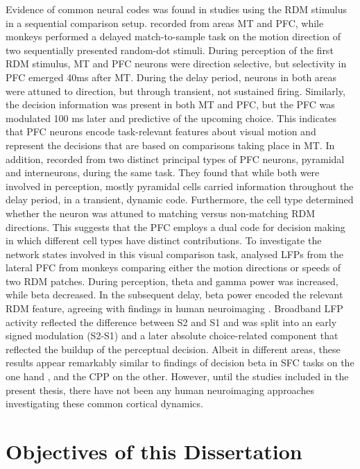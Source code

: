 Evidence of common neural codes was found in studies using the RDM stimulus in a sequential comparison setup. \textcite{Zaksas2006} recorded from areas MT and PFC, while monkeys performed a delayed match-to-sample task on the motion direction of two sequentially presented random-dot stimuli. During perception of the first RDM stimulus, MT and PFC neurons were direction selective, but selectivity in PFC emerged 40ms after MT. During the delay period, neurons in both areas were attuned to direction, but through transient, not sustained firing. Similarly, the decision information was present in both MT and PFC, but the PFC was modulated 100 ms later and predictive of the upcoming choice. This indicates that PFC neurons encode task-relevant features about visual motion and represent the decisions that are based on comparisons taking place in MT. In addition, \textcite{Hussar2012} recorded from two distinct principal types of PFC neurons, pyramidal and interneurons, during the same task. They found that while both were involved in perception, mostly pyramidal cells carried information throughout the delay period, in a transient, dynamic code. Furthermore, the cell type determined whether the neuron was attuned to matching versus non-matching RDM directions. This suggests that the PFC employs a dual code for decision making in which different cell types have distinct contributions. To investigate the network states involved in this visual comparison task, \textcite{Wimmer2016} analysed LFPs from the lateral PFC from monkeys comparing either the motion directions or speeds of two RDM patches. During perception, theta and gamma power was increased, while beta decreased. In the subsequent delay, beta power encoded the relevant RDM feature, agreeing with findings in human neuroimaging \parencite{Spitzer2010,Spitzer2012}. Broadband LFP activity reflected the difference between S2 and S1 and was split into an early signed modulation (S2-S1) and a later absolute choice-related component that reflected the buildup of the perceptual decision. Albeit in different areas, these results appear remarkably similar to findings of decision beta in SFC tasks on the one hand \parencite{Haegens2011,Herding2016}, and the CPP \parencite{Kelly2013} on the other. However, until the studies included in the present thesis, there have not been any human neuroimaging approaches investigating these common cortical dynamics. 

\section{Objectives of this Dissertation}

